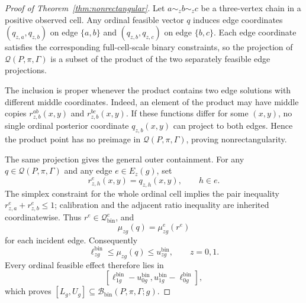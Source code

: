 \documentclass[11pt]{article}
\theoremstyle{definition}
\theoremstyle{plain}
\theoremstyle{remark}
\begin{document}
\begin{proof}[Proof of Theorem~\ref{thm:nonrectangular}]
Let \(a\sim_z b\sim_z c\) be a three-vertex chain in a positive observed cell.
Any ordinal feasible vector \(q\) induces edge coordinates
\((q_{z,a},q_{z,b})\) on edge \(\{a,b\}\) and \((q_{z,b},q_{z,c})\) on edge
\(\{b,c\}\).  Each edge coordinate satisfies the corresponding full-cell-scale
binary constraints, so the projection of \(\mathcal Q(P,\pi,\Gamma)\) is a
subset of the product of the two separately feasible edge projections.

The inclusion is proper whenever the product contains two edge solutions with
different middle coordinates.  Indeed, an element of the product may have
middle copies \(r^{ab}_{z,b}(x,y)\) and \(r^{bc}_{z,b}(x,y)\).  If these
functions differ for some \((x,y)\), no single ordinal posterior coordinate
\(q_{z,b}(x,y)\) can project to both edges.  Hence the product point has no
preimage in \(\mathcal Q(P,\pi,\Gamma)\), proving nonrectangularity.

The same projection gives the general outer containment.  For any
\(q\in\mathcal Q(P,\pi,\Gamma)\) and any edge \(e\in E_z(g)\), set
\[
  r^e_{z,h}(x,y)=q_{z,h}(x,y),\qquad h\in e.
\]
The simplex constraint for the whole ordinal cell implies the pair inequality
\(r^e_{z,a}+r^e_{z,b}\le1\); calibration and the adjacent ratio inequality are
inherited coordinatewise.  Thus \(r^e\in\mathcal Q^e_{\mathrm{bin}}\), and
\[
  \mu_{zg}(q)=\mu^e_{zg}(r^e)
\]
for each incident edge.  Consequently
\[
  \ell^{\mathrm{bin}}_{zg}\le \mu_{zg}(q)\le u^{\mathrm{bin}}_{zg},
  \qquad z=0,1.
\]
Every ordinal feasible effect therefore lies in
\[
  [\ell^{\mathrm{bin}}_{1g}-u^{\mathrm{bin}}_{0g},
   u^{\mathrm{bin}}_{1g}-\ell^{\mathrm{bin}}_{0g}],
\]
which proves
\([L_g,U_g]\subseteq\mathcal B_{\mathrm{bin}}(P,\pi,\Gamma;g)\).


\end{proof}
\end{document}
